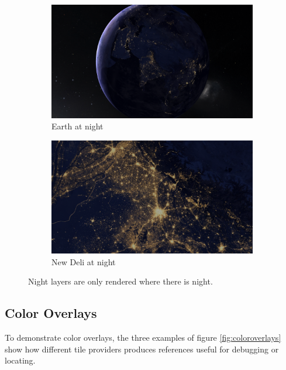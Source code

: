 \begin{figure}[h]
    \centering
    \begin{subfigure}[bt]{0.9\textwidth}
        \includegraphics[width=\textwidth]{figures/results/screenshots/night_earth.png}
        \caption{Earth at night}
    \end{subfigure}
    \begin{subfigure}[bt]{0.9\textwidth}
        \includegraphics[width=\textwidth]{figures/results/screenshots/night_new_deli.png}
        \caption{New Deli at night}
    \end{subfigure}
    \caption{Night layers are only rendered where there is night.}
\end{figure}

\clearpage
\subsection{Color Overlays}
\FloatBarrier

To demonstrate color overlays, the three examples of figure \ref{fig:coloroverlays} show how different tile providers produces references useful for debugging or locating. 

